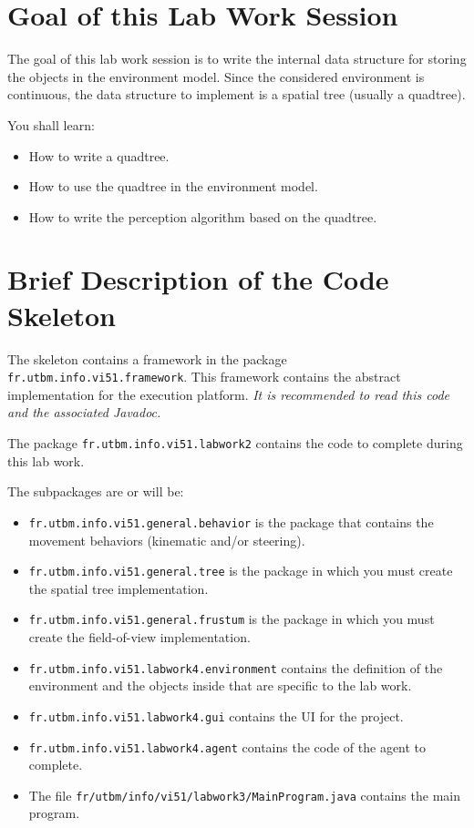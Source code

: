 \documentclass[article,english,nodocumentinfo]{multiagentfrreport}
\begin{document}
\section{Goal of this Lab Work Session}

The goal of this lab work session is to write the internal data structure for storing the objects in the environment model.
Since the considered environment is continuous, the data structure to implement is a spatial tree (usually a quadtree).

You shall learn: 
\begin{itemize}
\item How to write a quadtree.
\item How to use the quadtree in the environment model.
\item How to write the perception algorithm based on the quadtree.
\end{itemize}



\section{Brief Description of the Code Skeleton}

The skeleton contains a framework in the package \texttt{fr.utbm.info.vi51.framework}.
This framework contains the abstract implementation for the execution platform.
\emph{It is recommended to read this code and the associated Javadoc.}

The package \texttt{fr.utbm.info.vi51.labwork2} contains the code to complete during this lab work.

The subpackages are or will be:
\begin{itemize}
\item \texttt{fr.utbm.info.vi51.general.behavior} is the package that contains the movement behaviors (kinematic and/or steering).
\item \texttt{fr.utbm.info.vi51.general.tree} is the package in which you must create the spatial tree implementation.
\item \texttt{fr.utbm.info.vi51.general.frustum} is the package in which you must create the field-of-view implementation.
\item \texttt{fr.utbm.info.vi51.labwork4.environment} contains the definition of the environment and the objects inside that are specific to the lab work.
\item \texttt{fr.utbm.info.vi51.labwork4.gui} contains the UI for the project.
\item \texttt{fr.utbm.info.vi51.labwork4.agent} contains the code of the agent to complete.
\item The file \texttt{fr/utbm/info/vi51/labwork3/MainProgram.java} contains the main program.
\end{itemize}
\end{document}
